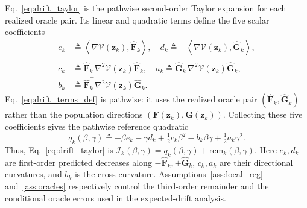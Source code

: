 \documentclass[journal]{IEEEtran}
\theoremstyle{remark}
\newcommand{\inner}[2]{\left\langle #1,#2\right\rangle}
\newcommand{\bz}{\boldsymbol{z}}
\newcommand{\bF}{\boldsymbol{F}}
\newcommand{\bG}{\boldsymbol{G}}
\newcommand{\hatF}{\widehat{\boldsymbol{F}}}
\newcommand{\hatG}{\widehat{\boldsymbol{G}}}
\newcommand{\Vk}{\mathcal{V}}
\begin{document}
	Eq.~\eqref{eq:drift_taylor} is the pathwise second-order Taylor expansion for each realized oracle pair.
	Its linear and quadratic terms define the five scalar coefficients
	\begin{equation}\label{eq:drift_terms_def}
		\begin{aligned}
			e_{k}&\triangleq\inner{\nabla\Vk(\bz_{k})}{\hatF_{k}},
			\quad
			d_{k}\triangleq -\inner{\nabla\Vk(\bz_{k})}{\hatG_{k}},\\
			c_{k}&\triangleq\hatF_{k}^{\top}\nabla^{2}\Vk(\bz_{k})\hatF_{k},
			\quad
			a_{k}\triangleq\hatG_{k}^{\top}\nabla^{2}\Vk(\bz_{k})\hatG_{k},\\
			b_{k}&\triangleq\hatF_{k}^{\top}\nabla^{2}\Vk(\bz_{k})\hatG_{k}.
		\end{aligned}
	\end{equation}
	Eq.~\eqref{eq:drift_terms_def} is pathwise: it uses the realized oracle pair $(\hatF_k,\hatG_k)$ rather than the population directions $(\bF(\bz_k),\bG(\bz_k))$.
	Collecting these five coefficients gives the pathwise reference quadratic
	\begin{equation}\label{eq:qref}
		q_k(\beta,\gamma)
		\triangleq
		-\beta e_k-\gamma d_k
		+\tfrac12c_k\beta^2-b_k\beta\gamma
		+\tfrac12a_k\gamma^2.
	\end{equation}
	Thus, Eq.~\eqref{eq:drift_taylor} is $\mathscr I_k(\beta,\gamma)=q_k(\beta,\gamma)+\mathrm{rem}_k(\beta,\gamma)$.
	Here $e_k,d_k$ are first-order predicted decreases along $-\hatF_k,+\hatG_k$, $c_k,a_k$ are their directional curvatures, and $b_k$ is the cross-curvature.
	Assumptions~\ref{ass:local_reg} and~\ref{ass:oracles} respectively control the third-order remainder and the conditional oracle errors used in the expected-drift analysis.
	
\end{document}
